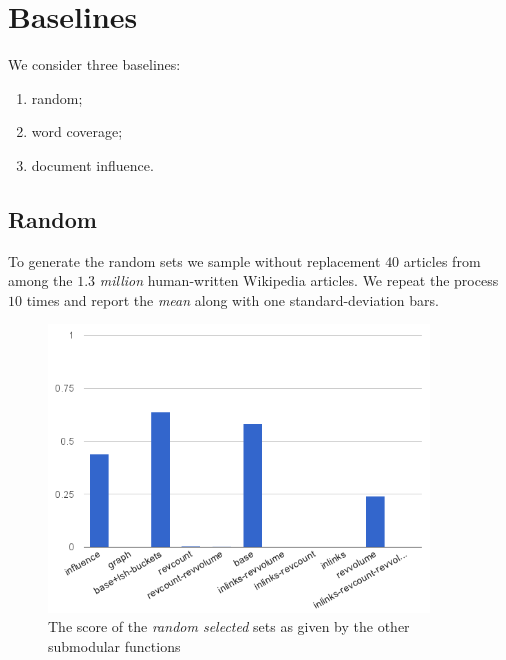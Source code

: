 \section{Baselines}

We consider three baselines:
\begin{enumerate}
  \item random;
  \item word coverage;
  \item document influence.
\end{enumerate}

\subsection{Random}

To generate the random sets we sample without replacement \(40\) articles from
among the \(1.3\) \emph{million} human-written Wikipedia articles. We repeat
the process \(10\) times and report the \emph{mean} along with one
standard-deviation bars. 

\begin{figure}
  \centering
  \includegraphics[width=0.9\textwidth,natwidth=555,natheight=419]{images/rand-mean.png}
  \caption{The score of the \emph{random selected} sets as given by the other
  submodular functions}
  \label{img:rand-mean}
\end{figure}

